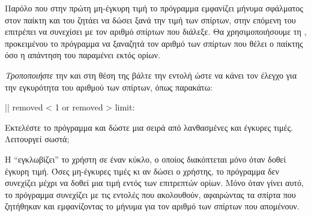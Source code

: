 \documentclass[a4paper,11pt,oneside]{book}
\begin{document}
\begin{step}
\label{step:check-matches-loop}
Παρόλο που στην πρώτη μη-έγκυρη τιμή το πρόγραμμα εμφανίζει μήνυμα σφάλματος στον παίκτη και του ζητάει να δώσει ξανά την τιμή των σπίρτων, στην επόμενη του επιτρέπει να συνεχίσει με τον αριθμό σπίρτων που διάλεξε. Θα χρησιμοποιήσουμε τη , προκειμένου το πρόγραμμα να ξαναζητά τον αριθμό των σπίρτων που θέλει ο παίκτης όσο η απάντηση του παραμένει εκτός ορίων.

\emph{Τροποποιήστε} την  και στη θέση της βάλτε την εντολή  ώστε να κάνει τον έλεγχο για την εγκυρότητα του αριθμού των σπίρτων, όπως παρακάτω:

\begin{pyplain}
|| removed < 1 or removed > limit:
\end{pyplain}

Εκτελέστε το πρόγραμμα και δώστε μια σειρά από λανθασμένες και έγκυρες τιμές. Λειτουργεί σωστά;

\begin{answer}
H  ``εγκλωβίζει'' το χρήστη σε έναν κύκλο, ο οποίος διακόπτεται μόνο όταν δοθεί έγκυρη τιμή. Όσες μη-έγκυρες τιμές κι αν δώσει ο χρήστης, το πρόγραμμα δεν συνεχίζει μέχρι να δοθεί μια τιμή εντός των επιτρεπτών ορίων. Μόνο όταν γίνει αυτό, το πρόγραμμα συνεχίζει με τις εντολές που ακολουθούν, αφαιρώντας τα σπίρτα που ζητήθηκαν και εμφανίζοντας το μήνυμα για τον αριθμό των σπίρτων που απομένουν.
\end{answer}

\end{step}
\end{document}
